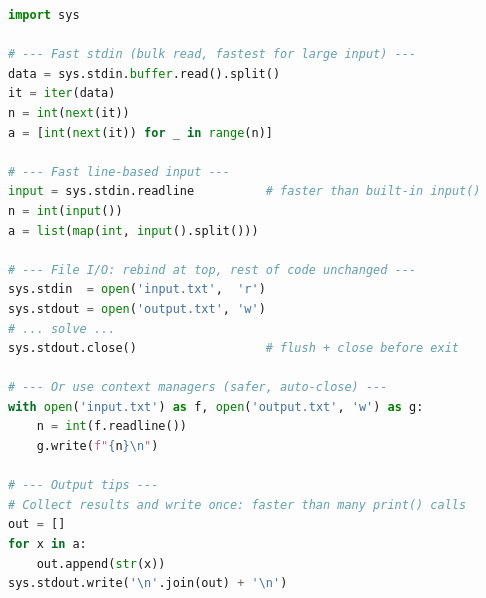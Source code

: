 
\begin{lstlisting}[language=Python]
import sys

# --- Fast stdin (bulk read, fastest for large input) ---
data = sys.stdin.buffer.read().split()
it = iter(data)
n = int(next(it))
a = [int(next(it)) for _ in range(n)]

# --- Fast line-based input ---
input = sys.stdin.readline          # faster than built-in input()
n = int(input())
a = list(map(int, input().split()))

# --- File I/O: rebind at top, rest of code unchanged ---
sys.stdin  = open('input.txt',  'r')
sys.stdout = open('output.txt', 'w')
# ... solve ...
sys.stdout.close()                  # flush + close before exit

# --- Or use context managers (safer, auto-close) ---
with open('input.txt') as f, open('output.txt', 'w') as g:
    n = int(f.readline())
    g.write(f"{n}\n")

# --- Output tips ---
# Collect results and write once: faster than many print() calls
out = []
for x in a:
    out.append(str(x))
sys.stdout.write('\n'.join(out) + '\n')
\end{lstlisting}
